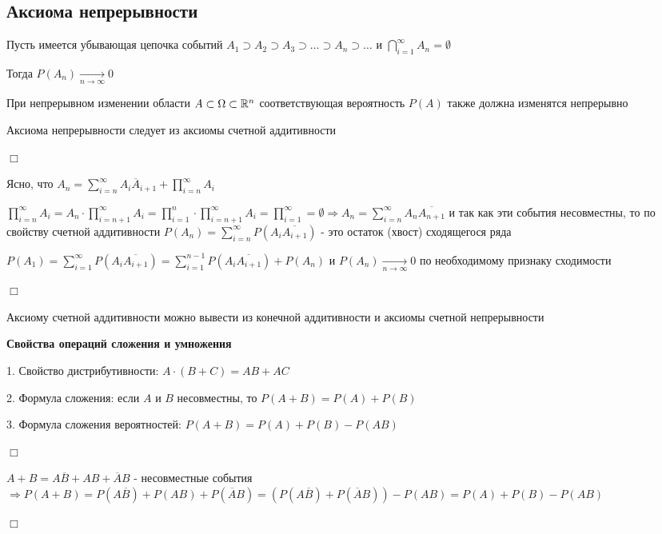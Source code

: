 \documentclass[12pt]{article}
\begin{document}
    \subsection{Аксиома непрерывности}

    Пусть имеется убывающая цепочка событий $A_1 \supset A_2 \supset A_3 \supset \dots \supset A_n \supset \dots$ и $\bigcap_{i = 1}^\infty A_n = \emptyset$

    Тогда $P(A_n) \underset{n \to \infty}{\to} 0$

    При непрерывном изменении области $A \subset \Omega \subset \mathbb{R}^n$ соответствующая вероятность $P(A)$ также должна изменятся непрерывно

    \Th Аксиома непрерывности следует из аксиомы счетной аддитивности

    \begin{tcolorbox}
        $\Box$

        Ясно, что $A_n = \sum_{i = n}^\infty A_i \overline{A}_{i + 1} + \prod_{i = n}^\infty A_i$

        $\prod_{i = n}^\infty A_i = A_n \cdot \prod_{i = n + 1}^\infty A_i = \prod_{i = 1}^n
        \cdot \prod_{i = n + 1}^\infty A_i = \prod_{i = 1}^\infty = \emptyset \Longrightarrow
        A_n = \sum_{i = n}^\infty A_n \overline{A_{n + 1}}$ и так как эти события несовместны,
        то по свойству счетной аддитивности $P(A_n) = \sum_{i = n}^\infty P(A_i \overline{A_{i + 1}})$ - это остаток (хвост) сходящегося ряда

        $P(A_1) = \sum_{i = 1}^\infty P(A_i \overline{A_{i + 1}}) = \sum_{i = 1}^{n - 1} P(A_i \overline{A_{i + 1}}) + P(A_n)$ и $P(A_n) \underset{n \to \infty}{\to} 0$ по необходимому признаку сходимости

        $\Box$
    \end{tcolorbox}

    \Nota Аксиому счетной аддитивности можно вывести из конечной аддитивности и аксиомы счетной непрерывности

    \textbf{Свойства операций сложения и умножения}

    1. Свойство дистрибутивности: $A \cdot (B + C) = AB + AC$

    2. Формула сложения: если $A$ и $B$ несовместны, то $P(A + B) = P(A) + P(B)$

    3. Формула сложения вероятностей: $P(A + B) = P(A) + P(B) - P(AB)$

    \begin{tcolorbox}
        $\Box$

        $A + B = A\overline{B} + AB + \overline{A}B$ - несовместные события $\Longrightarrow P(A + B) = P(A\overline{B}) + P(AB) + P(\overline{A}B) =
        (P(A\overline{B}) + P(\overline{A}B)) - P(AB) = P(A) + P(B) - P(AB)$

        $\Box$
    \end{tcolorbox}
\end{document}
